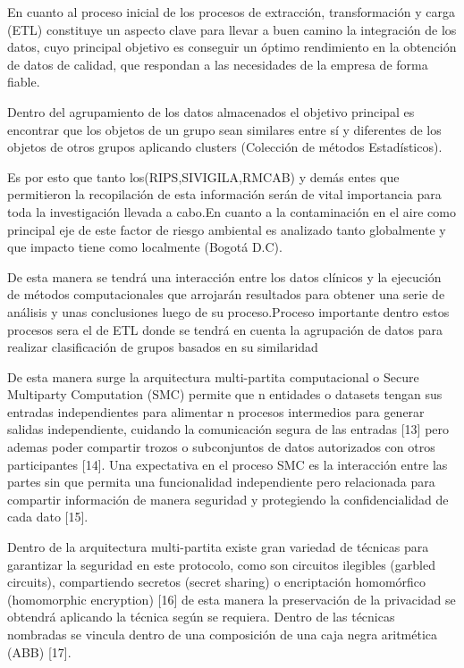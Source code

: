 \documentclass[a4paper, 11pt, oneside]{article}
\theoremstyle{definition}
\theoremstyle{remark}
\begin{document}
En cuanto al proceso inicial de los procesos de extracción, transformación y carga (ETL) constituye un aspecto clave para llevar a buen camino la integración de los datos, cuyo principal objetivo es conseguir un óptimo rendimiento en la obtención de datos de calidad, que respondan a las necesidades de la empresa de forma fiable.

Dentro del agrupamiento de los datos almacenados el objetivo principal es encontrar que los objetos de un grupo sean similares entre sí y diferentes de los objetos de otros grupos aplicando clusters (Colección de métodos Estadísticos).

Es por esto que tanto los(RIPS,SIVIGILA,RMCAB) y demás entes que permitieron la recopilación de esta información serán de vital importancia para toda la investigación llevada a cabo.En cuanto a la contaminación en el aire como principal eje de este factor de riesgo ambiental es analizado tanto globalmente y que impacto tiene como localmente (Bogotá D.C).

De esta manera se tendrá una interacción entre los datos clínicos y la ejecución de métodos computacionales que arrojarán resultados para obtener una serie de análisis y unas conclusiones luego de su proceso.Proceso importante dentro estos procesos sera el de ETL donde se tendrá en cuenta la agrupación de datos para realizar clasificación de grupos  basados en su similaridad 

De esta manera surge la arquitectura multi-partita computacional o  Secure Multiparty Computation (SMC) permite que n entidades o datasets tengan sus entradas independientes para alimentar n procesos intermedios para generar salidas independiente, cuidando la comunicación segura de las entradas [13] pero ademas poder compartir trozos o subconjuntos de datos autorizados con otros participantes  [14]. Una expectativa en el proceso SMC es la interacción entre las partes sin que permita una funcionalidad independiente pero relacionada para compartir información de manera seguridad y protegiendo la confidencialidad de cada dato [15].  

Dentro de la arquitectura multi-partita existe gran variedad de técnicas para garantizar la seguridad en este protocolo, como son circuitos ilegibles (garbled circuits), compartiendo secretos (secret sharing) o encriptación homomórfico (homomorphic encryption) [16] de esta manera la preservación de la privacidad se obtendrá aplicando la técnica según se requiera. Dentro de las técnicas nombradas se vincula dentro de una composición de una caja negra aritmética (ABB) [17].
\end{document}
